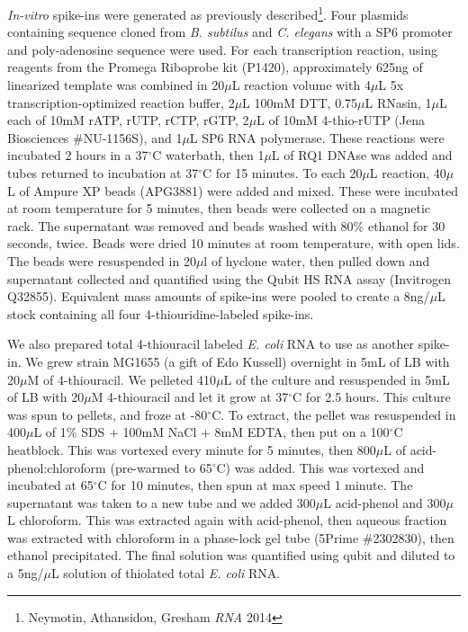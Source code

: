 \emph{In-vitro} spike-ins were generated as previously
described\footnote{Neymotin, Athansidou, Gresham \emph{RNA} 2014}. Four
plasmids containing sequence cloned from \emph{B. subtilus} and \emph{C.
elegans} with a SP6 promoter and poly-adenosine sequence were used. For
each transcription reaction, using reagents from the Promega Riboprobe
kit (P1420), approximately 625ng of linearized template was combined in
20\(\mu\)L reaction volume with 4\(\mu\)L 5x transcription-optimized
reaction buffer, 2\(\mu\)L 100mM DTT, 0.75\(\mu\)L RNasin, 1\(\mu\)L
each of 10mM rATP, rUTP, rCTP, rGTP, 2\(\mu\)L of 10mM 4-thio-rUTP (Jena
Biosciences \#NU-1156S), and 1\(\mu\)L SP6 RNA polymerase. These
reactions were incubated 2 hours in a 37\(^{\circ}\)C waterbath, then
1\(\mu\)L of RQ1 DNAse was added and tubes returned to incubation at
37\(^{\circ}\)C for 15 minutes. To each 20\(\mu\)L reaction, 40\(\mu\)L
of Ampure XP beads (APG3881) were added and mixed. These were incubated
at room temperature for 5 minutes, then beads were collected on a
magnetic rack. The supernatant was removed and beads washed with 80\%
ethanol for 30 seconds, twice. Beads were dried 10 minutes at room
temperature, with open lids. The beads were resuspended in 20\(\mu\)l of
hyclone water, then pulled down and supernatant collected and quantified
using the Qubit HS RNA assay (Invitrogen Q32855). Equivalent mass
amounts of spike-ins were pooled to create a 8ng/\(\mu\)L stock
containing all four 4-thiouridine-labeled spike-ins.

We also prepared total 4-thiouracil labeled \emph{E. coli} RNA to use as
another spike-in. We grew strain MG1655 (a gift of Edo Kussell)
overnight in 5mL of LB with 20\(\mu\)M of 4-thiouracil. We pelleted
410\(\mu\)L of the culture and resuspended in 5mL of LB with 20\(\mu\)M
4-thiouracil and let it grow at 37\(^{\circ}\)C for 2.5 hours. This
culture was spun to pellets, and froze at -80\(^{\circ}\)C. To extract,
the pellet was resuspended in 400\(\mu\)L of 1\% SDS + 100mM NaCl + 8mM
EDTA, then put on a 100\(^{\circ}\)C heatblock. This was vortexed every
minute for 5 minutes, then 800\(\mu\)L of acid-phenol:chloroform
(pre-warmed to 65\(^{\circ}\)C) was added. This was vortexed and
incubated at 65\(^{\circ}\)C for 10 minutes, then spun at max speed 1
minute. The supernatant was taken to a new tube and we added 300\(\mu\)L
acid-phenol and 300\(\mu\)L chloroform. This was extracted again with
acid-phenol, then aqueous fraction was extracted with chloroform in a
phase-lock gel tube (5Prime \#2302830), then ethanol precipitated. The
final solution was quantified using qubit and diluted to a 5ng/\(\mu\)L
solution of thiolated total \emph{E. coli} RNA.

